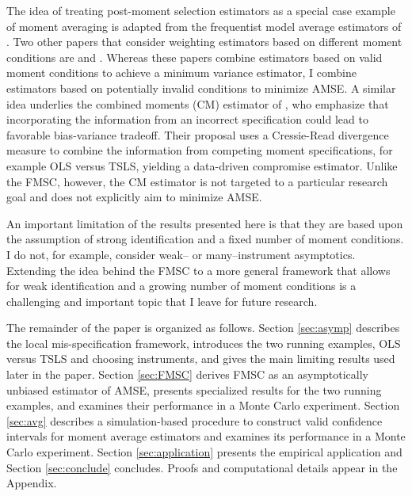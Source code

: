 The idea of treating post-moment selection estimators as a special case example of moment averaging is adapted from the frequentist model average estimators of \cite{HjortClaeskens}.
Two other papers that consider weighting estimators based on different moment conditions are \cite{Xiao} and \cite{ChenChavezLinton}.
Whereas these papers combine estimators based on valid moment conditions to achieve a minimum variance estimator, I combine estimators based on potentially invalid conditions to minimize AMSE. 
A similar idea underlies the combined moments (CM) estimator of \cite{Judge2007}, who emphasize that incorporating the information from an incorrect specification could lead to favorable bias-variance tradeoff. 
Their proposal uses a Cressie-Read divergence measure to combine the information from competing moment specifications, for example OLS versus TSLS, yielding a data-driven compromise estimator. Unlike the FMSC, however, the CM estimator is not targeted to a particular research goal and does not explicitly aim to minimize AMSE.

An important limitation of the results presented here is that they are based upon the assumption of strong identification and a fixed number of moment conditions.
I do not, for example, consider weak-- or many--instrument asymptotics.
Extending the idea behind the FMSC to a more general framework that allows for weak identification and a growing number of moment conditions is a challenging and important topic that I leave for future research.

The remainder of the paper is organized as follows.
Section \ref{sec:asymp} describes the local mis-specification framework, introduces the two running examples, OLS versus TSLS and choosing instruments, and gives the main limiting results used later in the paper. 
Section \ref{sec:FMSC} derives FMSC as an asymptotically unbiased estimator of AMSE, presents specialized results for the two running examples, and examines their performance in a Monte Carlo experiment. 
Section \ref{sec:avg} describes a simulation-based procedure to construct valid confidence intervals for moment average estimators and examines its performance in a Monte Carlo experiment. Section \ref{sec:application} presents the empirical application and Section \ref{sec:conclude} concludes.
Proofs and computational details appear in the Appendix.
